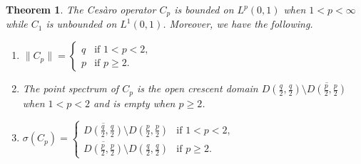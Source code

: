 \documentclass[11pt]{amsart}
\numberwithin{equation}{section}
\theoremstyle{plain}
\newtheorem{Theorem}[equation]{Theorem}
\theoremstyle{definition}
\renewcommand{\geq}{\geqslant}
\newcommand{\0}{{\color{lightgray}0}}
\begin{document}
\begin{Theorem}\label{MainT}
The Ces\`{a}ro operator $C_p$ is bounded on $L^p(0, 1)$  when $1 < p < \infty$ while $C_1$ is unbounded on $L^1(0, 1)$. Moreover, we have the following.
\begin{enumerate}
\item 
${\displaystyle \|C_{p}\| = \begin{cases}
q & \mbox{if $1 < p < 2$,}\\
p & \mbox{if $p \geq 2$.}
\end{cases}}$
\item The point spectrum of $C_p$  is the open crescent domain 
$D(\frac{q}{2}, \frac{q}{2}) \setminus \overline{D(\frac{p}{2}, \frac{p}{2})}$
when $1 < p < 2$ and is empty when $p \geq 2$.
\item
${\displaystyle \sigma(C_{p}) = \begin{cases}
{\displaystyle \overline{D(\tfrac{q}{2}, \tfrac{q}{2})} \setminus D(\tfrac{p}{2}, \tfrac{p}{2})} & \mbox{if $1 < p < 2$,}\\[3pt]
{\displaystyle  \overline{D(\tfrac{p}{2}, \tfrac{p}{2})} \setminus D(\tfrac{q}{2}, \tfrac{q}{2})} & \mbox{if $p \geq 2$.}
\end{cases}}$
\end{enumerate}
\end{Theorem}
\end{document}
